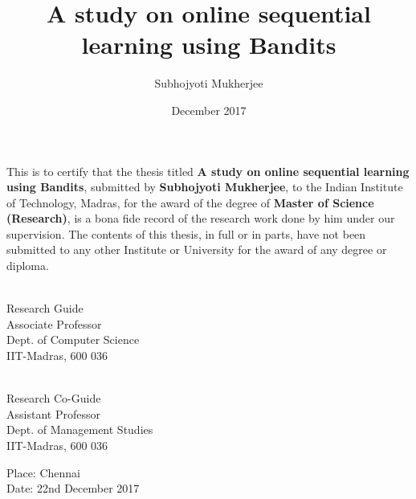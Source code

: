 \documentclass[MS]{iitmdiss}
\begin{document}

\title{A study on online sequential learning using Bandits}

\author{Subhojyoti Mukherjee}

\date{December 2017}

\maketitle

\certificate

\vspace*{0.5in}

\noindent This is to certify that the thesis titled {\bf A study on online sequential learning using Bandits}, submitted by {\bf Subhojyoti Mukherjee}, 
  to the Indian Institute of Technology, Madras, for
the award of the degree of {\bf Master of Science (Research)}, is a bona fide
record of the research work done by him under our supervision.  The
contents of this thesis, in full or in parts, have not been submitted
to any other Institute or University for the award of any degree or
diploma.

\vspace*{1.5in}

\begin{singlespacing}
\hspace*{-0.25in}
\parbox{2.5in}{
 \\
\noindent Research Guide \\ 
\noindent Associate Professor \\
\noindent Dept. of Computer Science\\
\noindent IIT-Madras, 600 036 \\
} 
\hspace*{1.0in} 
\parbox{2.5in}{
 \\
\noindent Research Co-Guide \\ 
\noindent Assistant Professor \\
\noindent Dept.  of  Management Studies\\
\noindent IIT-Madras, 600 036 \\
}  
\end{singlespacing}
\vspace*{0.25in}
\noindent Place: Chennai\\
Date: 22nd December 2017 
\end{document}
